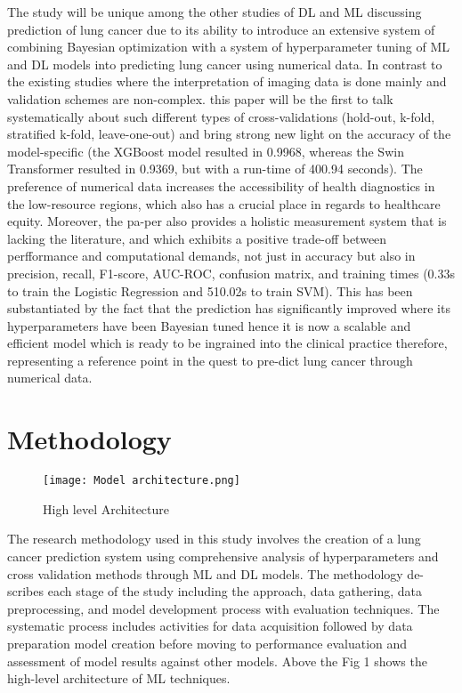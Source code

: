 \documentclass[runningheads]{llncs}
\begin{document}
The study will be unique among the other studies of DL and ML discussing prediction of lung cancer due to its ability to introduce an extensive system of combining Bayesian optimization with a system of hyperparameter tuning of ML and DL models into predicting lung cancer using numerical data. In contrast to the existing studies where the interpretation of imaging data is done mainly and validation schemes are non-complex. this paper will be the first to talk systematically about such different types of cross-validations (hold-out, k-fold, stratified k-fold, leave-one-out) and bring strong new light on the accuracy of the model-specific (the XGBoost model resulted in 0.9968, whereas the Swin Transformer resulted in 0.9369, but with a run-time of 400.94 seconds). The preference of numerical data increases the accessibility of health diagnostics in the low-resource regions, which also has a crucial place in regards to healthcare equity. Moreover, the pa-per also provides a holistic measurement system that is lacking the literature, and which exhibits a positive trade-off between perfformance and computational demands, not just in accuracy but also in precision, recall, F1-score, AUC-ROC, confusion matrix, and training times (0.33s to train the Logistic Regression and 510.02s to train SVM). This has been substantiated by the fact that the prediction has significantly improved where its hyperparameters have been Bayesian tuned hence it is now a scalable and efficient model which is ready to be ingrained into the clinical practice therefore, representing a reference point in the quest to pre-dict lung cancer through numerical data.



\section{Methodology}
\begin{figure}[h]
    \centering
    \texttt{[image: Model architecture.png]}
    \caption{High level Architecture}
    \label{fig:enter-label}
\end{figure}

The research methodology used in this study involves the creation of a lung cancer prediction system using comprehensive analysis of hyperparameters and cross validation methods through ML and DL models. 
The methodology de-scribes each stage of the study including the approach, data gathering, data preprocessing, and model development process with evaluation techniques. The systematic process includes activities for data acquisition followed by data preparation model creation before moving to performance evaluation and assessment of model results against other models. Above the Fig 1 shows the high-level architecture of ML techniques. 
\end{document}

